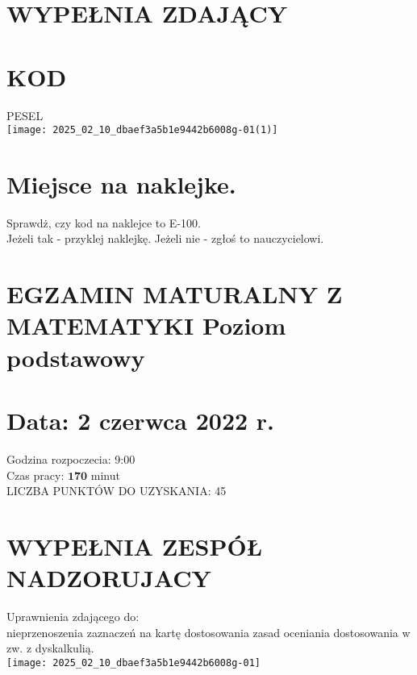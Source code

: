 \documentclass[10pt]{article}
\begin{document}
\section*{WYPEŁNIA ZDAJĄCY}
\section*{KOD}
PESEL\\
\texttt{[image: 2025\_02\_10\_dbaef3a5b1e9442b6008g-01(1)]}

\section*{Miejsce na naklejke.}
Sprawdż, czy kod na naklejce to E-100.\\
Jeżeli tak - przyklej naklejkę. Jeżeli nie - zgłoś to nauczycielowi.

\section*{EGZAMIN MATURALNY Z MATEMATYKI Poziom podstawowy}
\section*{Data: 2 czerwca 2022 r.}
Godzina rozpoczecia: 9:00\\
Czas pracy: \(\mathbf{1 7 0}\) minut\\
LICZBA PUNKTÓW DO UZYSKANIA: 45

\section*{WYPEŁNIA ZESPÓŁ NADZORUJACY}
Uprawnienia zdającego do:\\
nieprzenoszenia zaznaczeń na kartę dostosowania zasad oceniania dostosowania w zw. z dyskalkulią.\\
\texttt{[image: 2025\_02\_10\_dbaef3a5b1e9442b6008g-01]}
\end{document}
